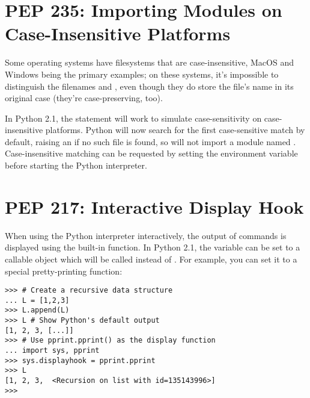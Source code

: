\documentclass{howto}
\begin{document}
\begin{seealso}


\end{seealso}



\section{PEP 235: Importing Modules on Case-Insensitive Platforms}

Some operating systems have filesystems that are case-insensitive,
MacOS and Windows being the primary examples; on these systems, it's
impossible to distinguish the filenames  and
, even though they do store the file's name 
in its original case (they're case-preserving, too).

In Python 2.1, the  statement will work to simulate
case-sensitivity on case-insensitive platforms.  Python will now
search for the first case-sensitive match by default, raising an
 if no such file is found, so 
will not import a module named .  Case-insensitive
matching can be requested by setting the  environment
variable before starting the Python interpreter.

\section{PEP 217: Interactive Display Hook}

When using the Python interpreter interactively, the output of
commands is displayed using the built-in  function.
In Python 2.1, the variable  can be set to a
callable object which will be called instead of .
For example, you can set it to a special pretty-printing function:

\begin{verbatim}
>>> # Create a recursive data structure
... L = [1,2,3]
>>> L.append(L)
>>> L # Show Python's default output
[1, 2, 3, [...]]
>>> # Use pprint.pprint() as the display function
... import sys, pprint
>>> sys.displayhook = pprint.pprint
>>> L
[1, 2, 3,  <Recursion on list with id=135143996>]
>>>
\end{verbatim}
\end{document}
